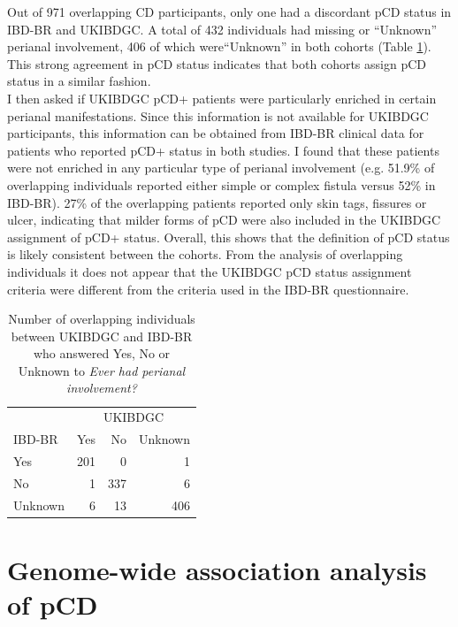 Out of 971 overlapping CD participants, only one had a discordant pCD status in IBD-BR and UKIBDGC. A total of 432 individuals had missing or “Unknown” perianal involvement, 406 of which were“Unknown” in both cohorts (Table \ref{table:cohort_pcd_agree}). This strong agreement in pCD status indicates that both cohorts assign pCD status in a similar fashion.\\

I then asked if UKIBDGC pCD+ patients were particularly enriched in certain perianal manifestations. Since this information is not available for UKIBDGC participants, this information can be obtained from IBD-BR clinical data for patients who reported pCD+ status in both studies. I found that these patients were not enriched in any particular type of perianal involvement (e.g. 51.9\% of overlapping individuals reported either simple or complex fistula versus 52\% in IBD-BR). 27\% of the overlapping patients reported only skin tags, fissures or ulcer, indicating that milder forms of pCD were also included in the UKIBDGC assignment of pCD+ status. Overall, this shows that the definition of pCD status is likely consistent between the cohorts. From the analysis of overlapping individuals it does not appear that the UKIBDGC pCD status assignment criteria were different from the criteria used in the IBD-BR questionnaire.


\begin{table}[htb]
  \caption{Number of overlapping individuals between UKIBDGC and IBD-BR who answered Yes, No or Unknown to \textit{Ever had perianal involvement?}}
  \label{table:cohort_pcd_agree}
  \centering
  \begin{tabular}[t]{|l|r|r|r|}
  \hline
  \multicolumn{1}{|c|}{ } & \multicolumn{3}{c|}{UKIBDGC} \\
  \cline{2-4}
  IBD-BR& Yes & No & Unknown\\
  \hline
  Yes & 201 & 0 & 1\\
  \hline
  No & 1 & 337 & 6\\
  \hline
  Unknown & 6 & 13 & 406\\
  \hline
  \end{tabular}
  \end{table}

  \section{Genome-wide association analysis of pCD}
